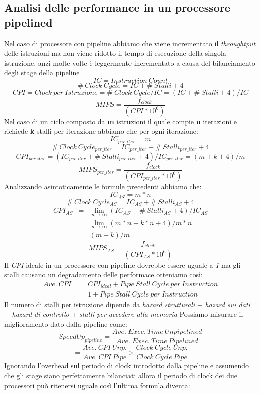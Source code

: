 \subsection{Analisi delle performance in un processore pipelined}
Nel caso di processore con pipeline abbiamo che viene incrementato il \emph{throughtput} delle istruzioni ma non viene ridotto il tempo di esecuzione della singola istruzione, anzi molte volte è leggermente incrementato a causa del bilanciamento degli stage della pipeline
$$IC = Instruction \ Count$$
$$\# \ Clock \ Cycle = IC + \# \ Stalli + 4$$
$$CPI = Clock \ per \ Istruzione = \# \ Clock \ Cycle / IC = (IC + \# \ Stalli + 4) /IC$$
$$MIPS = \frac{f_{clock}}{(CPI * 10^6)}$$
Nel caso di un ciclo composto da \textbf{m} istruzioni il quale compie \textbf{n} iterazioni e richiede \textbf{k} stalli per iterazione abbiamo che per ogni iterazione:
$$IC_{per\_iter} = m$$
$$\# \ Clock \ Cycle_{per\_iter} = IC_{per\_iter} + \# \ Stalli_{per\_iter} + 4$$
$$CPI_{per\_iter} = (IC_{per\_iter} + \# \ Stalli_{per\_iter} + 4) /IC_{per\_iter}= (m + k +4) / m$$
$$MIPS_{per\_iter} = \frac{f_{clock}}{(CPI_{per\_iter} * 10^6)}$$
Analizzando asintoticamente le formule precedenti abbiamo che:
$$IC_{AS} = m * n$$
$$\# \ Clock \ Cycle_{AS} = IC_{AS} + \# \ Stalli_{AS} + 4$$
$$\begin{array}{rcl}
CPI_{AS} & = & \lim_{n \to \infty} (IC_{AS} + \# \ Stalli_{AS} + 4) /IC_{AS} \\
& = & \lim_{n \to \infty}(m*n + k*n +4) / m*n \\
& = & (m + k) / m
\end{array}
$$
$$MIPS_{AS} = \frac{f_{clock}}{(CPI_{AS} * 10^6)}$$
Il \emph{CPI} ideale in un processore con pipeline dovrebbe essere uguale a \emph{1} ma gli stalli causano un degradamento delle performace otteniamo così:
$$\begin{array}{rcl}
Ave. \ CPI & = & CPI_{ideal} + Pipe \ Stall \ Cycle \ per \ Instruction \\
 & = & 1 + Pipe \ Stall \ Cycle \ per \ Instruction 
\end{array}$$
Il numero di stalli per istruzione dipende da \emph{hazard strutturali} + \emph{hazard sui dati} + \emph{hazard di controllo} + \emph{stalli per accedere alla memoria}
Possiamo misurare il miglioramento dato dalla pipeline come:
$$SpeedUp_{pipeline} = \frac{Ave. \ Exec. \ Time \ Unpipelined}{Ave. \ Exec. \ Time \ Pipelined}$$
$$ = \frac{Ave. \ CPI \ Unp.}{Ave. \ CPI \ Pipe} \times \frac{Clock \ Cycle \ Unp.}{Clock \ Cycle \ Pipe}$$
Ignorando l'overhead sul periodo di clock introdotto dalla pipeline e assumendo che gli stage siano perfettamente bilanciati allora il periodo di clock dei due processori può ritenersi uguale così l'ultima formula diventa:
